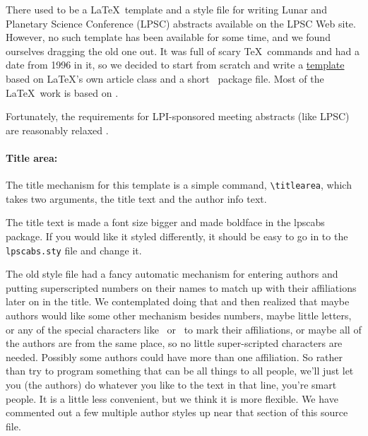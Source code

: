 \documentclass[twoside]{article}
\begin{document}


%

%


There used to be a \LaTeX\ template and a style file for writing
Lunar and Planetary Science Conference (LPSC) abstracts available
on the LPSC Web site.  However, no such template has been available
for some time, and we found ourselves dragging the old one out.  It
was full of scary \TeX\ commands and had a date from 1996 in it,
so we decided to start from scratch and write a
\href{https://github.com/rbeyer/lpsc_template}{template} based
on \LaTeX's own article class and a short \LaTeXe\ package file.
Most of the \LaTeX\ work is based on \citet{latexguide}.

Fortunately, the requirements for LPI-sponsored meeting abstracts (like LPSC)
are reasonably relaxed \citep{LPSC}.

\paragraph{Title area:}

The title mechanism for this template is a simple command,
\verb=\titlearea=, which takes two arguments, the title text and the
author info text.

The title text is made a font size bigger and made boldface in the
lpscabs package.  If you would like it styled differently, it should
be easy to go in to the \texttt{lpscabs.sty} file and change it.

The old style file had a fancy automatic mechanism for entering
authors and putting superscripted numbers on their names to match
up with their affiliations later on in the title.  We contemplated
doing that and then realized that maybe authors would like some
other mechanism besides numbers, maybe little letters, or any of
the special characters like \dag\ or \ddag\ to mark their affiliations,
or maybe all of the authors are from the same place, so no little
super-scripted characters are needed.  Possibly some authors could
have more than one affiliation.  So rather than try to program
something that can be all things to all people, we'll just let you
(the authors) do whatever you like to the text in that line, you're
smart people.  It is a little less convenient, but we think it is more
flexible.  We have commented out a few multiple author styles up
near that section of this source file.
\end{document}

